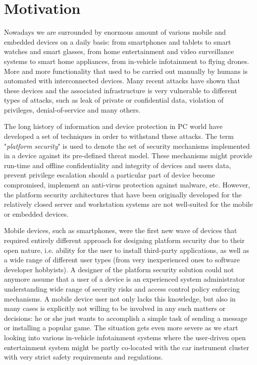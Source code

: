 \begin{quoting}
\end{quoting}

\section{Motivation}

Nowadays we are surrounded by enormous amount of various mobile and embedded devices on a daily basis: from smartphones and tablets to smart watches and smart glasses, from home entertainment and video surveillance systems to smart home appliances, from in-vehicle infotainment to flying drones. More and more functionality that used to be carried out manually by humans is automated with interconnected devices. Many recent attacks have shown that these devices and the associated infrastructure is very vulnerable to different types of attacks, such as leak of private or confidential data, violation of privileges, denial-of-service and many others. 

The long history of information and device protection in PC world have developed a set of techniques in order to withstand these attacks. The term "\textit{platform security}" is used to denote the set of security mechanisms implemented in a device against its pre-defined threat model. These mechanisms might provide run-time and offline confidentiality and integrity of devices and users data, prevent privilege escalation should a particular part of device become compromised, implement an anti-virus protection against malware, etc. However, the platform security architectures that have been originally developed for the relatively closed server and workstation systems are not well-suited for the mobile or embedded devices. 

Mobile devices, such as smartphones, were the first new wave of devices that required entirely different approach for designing platform security due to their open nature, i.e. ability for the user to install third-party applications, as well as a wide range of different user types (from very inexperienced ones to software developer hobbyists). A designer of the platform security solution could not anymore assume that a user of a device is an experienced system administrator understanding wide range of security risks and access control policy enforcing mechanisms. A mobile device user not only lacks this knowledge, but also in many cases is explicitly not willing to be involved in any such matters or decisions: he or she just wants to accomplish a simple task of sending a message or installing a popular game. The situation gets even more severe as we start looking into various in-vehicle infotainment systems where the user-driven open entertainment system might be partly co-located with the car instrument cluster with very strict safety requirements and regulations. 

